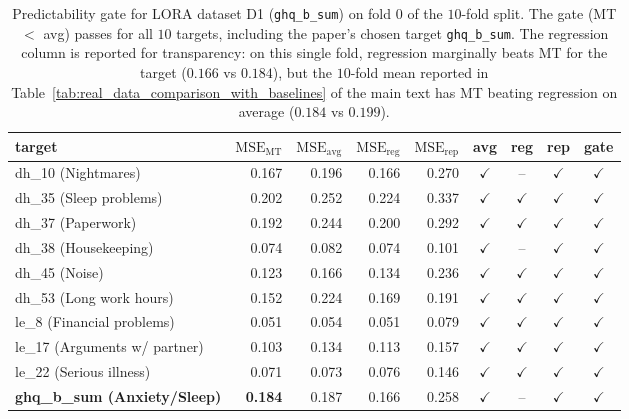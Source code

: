 \documentclass[AMA,Times1COL]{WileyNJDv5} %
\begin{document}
\begin{table}[ht]
\centering
\small
\begin{tabular}{l r r r r c c c c}
\toprule
target & $\mathrm{MSE}_{\mathrm{MT}}$ & $\mathrm{MSE}_{\mathrm{avg}}$ & $\mathrm{MSE}_{\mathrm{reg}}$ & $\mathrm{MSE}_{\mathrm{rep}}$ & avg & reg & rep & gate \\
\midrule
dh\_10 (Nightmares) & 0.167 & 0.196 & 0.166 & 0.270 & $\checkmark$ & -- & $\checkmark$ & $\checkmark$ \\
dh\_35 (Sleep problems) & 0.202 & 0.252 & 0.224 & 0.337 & $\checkmark$ & $\checkmark$ & $\checkmark$ & $\checkmark$ \\
dh\_37 (Paperwork) & 0.192 & 0.244 & 0.200 & 0.292 & $\checkmark$ & $\checkmark$ & $\checkmark$ & $\checkmark$ \\
dh\_38 (Housekeeping) & 0.074 & 0.082 & 0.074 & 0.101 & $\checkmark$ & -- & $\checkmark$ & $\checkmark$ \\
dh\_45 (Noise) & 0.123 & 0.166 & 0.134 & 0.236 & $\checkmark$ & $\checkmark$ & $\checkmark$ & $\checkmark$ \\
dh\_53 (Long work hours) & 0.152 & 0.224 & 0.169 & 0.191 & $\checkmark$ & $\checkmark$ & $\checkmark$ & $\checkmark$ \\
le\_8 (Financial problems) & 0.051 & 0.054 & 0.051 & 0.079 & $\checkmark$ & $\checkmark$ & $\checkmark$ & $\checkmark$ \\
le\_17 (Arguments w/ partner) & 0.103 & 0.134 & 0.113 & 0.157 & $\checkmark$ & $\checkmark$ & $\checkmark$ & $\checkmark$ \\
le\_22 (Serious illness) & 0.071 & 0.073 & 0.076 & 0.146 & $\checkmark$ & $\checkmark$ & $\checkmark$ & $\checkmark$ \\
\textbf{ghq\_b\_sum (Anxiety/Sleep)} & \textbf{0.184} & 0.187 & 0.166 & 0.258 & $\checkmark$ & -- & $\checkmark$ & \textbf{$\checkmark$} \\
\bottomrule
\end{tabular}
\caption{Predictability gate for LORA dataset D1 (\texttt{ghq\_b\_sum}) on fold $0$ of the $10$-fold split. The gate (MT $<$ avg) passes for all $10$ targets, including the paper's chosen target \texttt{ghq\_b\_sum}. The regression column is reported for transparency: on this single fold, regression marginally beats MT for the target ($0.166$ vs $0.184$), but the $10$-fold mean reported in Table~\ref{tab:real_data_comparison_with_baselines} of the main text has MT beating regression on average ($0.184$ vs $0.199$).}
\label{tab:supp_gate_lora_d1}
\end{table}
\end{document}
